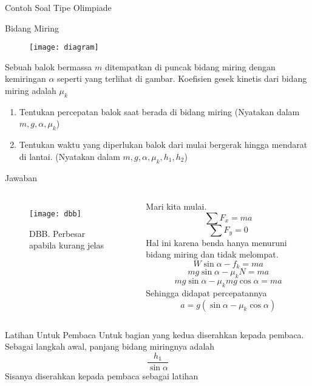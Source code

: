 \documentclass[10pt,aspectratio=54, handout]{beamer}
\begin{document}
  \begin{frame}{Contoh Soal Tipe Olimpiade}
    \begin{exampleblock}{Bidang Miring}
      \begin{figure}[!h]
      \begin{center}
          \texttt{[image: diagram]}
      \end{center}
      \end{figure}
      Sebuah balok bermassa $m$ ditempatkan di puncak bidang miring dengan kemiringan $\alpha$ seperti yang terlihat di gambar. Koefisien gesek kinetis dari bidang miring adalah $\mu_k$
      \begin{enumerate}
        \item Tentukan percepatan balok saat berada di bidang miring (Nyatakan dalam $m,g,\alpha,\mu_k$)
        \item Tentukan waktu yang diperlukan balok dari mulai bergerak hingga mendarat di lantai. (Nyatakan dalam $m,g,\alpha,\mu_k, h_1, h_2$)
      \end{enumerate}
    \end{exampleblock}
  \end{frame}
  
  
  \begin{frame}[shrink]{Jawaban}
    \begin{columns}[c]
      \begin{figure}
      \begin{center}
          \texttt{[image: dbb]}
      \end{center}
      \caption{DBB. Perbesar apabila kurang jelas}
      \end{figure}
      
      
      Mari kita mulai.
      $$ \sum{F_x} = ma$$
      $$ \sum{F_y} = 0$$
      Hal ini karena benda hanya menuruni bidang miring dan tidak melompat.
      $$W\sin \alpha - f_k = ma$$
      $$mg\sin\alpha - \mu_k N = ma$$
      $$mg\sin\alpha -\mu_k mg\cos\alpha = ma$$
      Sehingga didapat percepatannya
      $$\boxed{a = g(\sin\alpha - \mu_k\cos\alpha)}$$
    \end{columns}
    
    
  \end{frame}
  
  \begin{frame}{Latihan Untuk Pembaca}
    Untuk bagian yang kedua diserahkan kepada pembaca. Sebagai langkah awal, panjang bidang miringnya adalah 
    $$\frac{h_1}{\sin\alpha}$$
    Sisanya diserahkan kepada pembaca sebagai latihan
  \end{frame}
  
\end{document}
